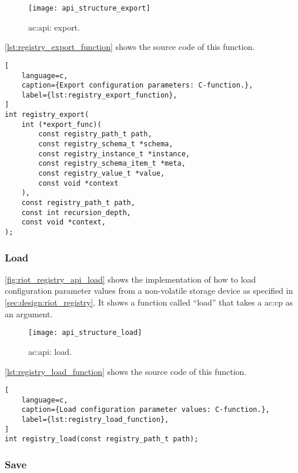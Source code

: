 {\begin{figure}[H]
    \centering
    \texttt{[image: api\_structure\_export]}
    \caption{ \gls{ac:api}: export.}
    \label{fig:riot_registry_api_export}
\end{figure}

\autoref{lst:registry_export_function} shows the source code of this function.

\begin{lstlisting}[
    language=c,
    caption={Export configuration parameters: C-function.},
    label={lst:registry_export_function},
]
int registry_export(
    int (*export_func)(
        const registry_path_t path,
        const registry_schema_t *schema,
        const registry_instance_t *instance,
        const registry_schema_item_t *meta,
        const registry_value_t *value,
        const void *context
    ),
    const registry_path_t path,
    const int recursion_depth,
    const void *context,
);
\end{lstlisting}

\subsubsection{Load}

\autoref{fig:riot_registry_api_load} shows the implementation of how to load configuration parameter values from a non-volatile storage device as specified in \autoref{sec:design:riot_registry}.
It shows a function called ``load'' that takes a \gls{ac:cp} as an argument.

\begin{figure}[H]
    \centering
    \texttt{[image: api\_structure\_load]}
    \caption{ \gls{ac:api}: load.}
    \label{fig:riot_registry_api_load}
\end{figure}

\autoref{lst:registry_load_function} shows the source code of this function.

\begin{lstlisting}[
    language=c,
    caption={Load configuration parameter values: C-function.},
    label={lst:registry_load_function},
]
int registry_load(const registry_path_t path);
\end{lstlisting}

\subsubsection{Save}

}
